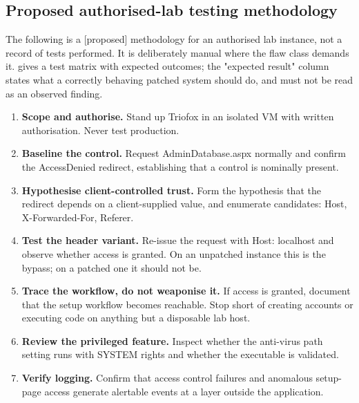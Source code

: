 \documentclass[11pt,a4paper]{article}
\newcommand{\code}[1]{{\small\ttfamily #1}}
\newcommand{\tier}[1]{{\small\color{meta}\textsf{[#1]}}}
\begin{document}
\subsection{Proposed authorised-lab testing methodology}

The following is a \tier{proposed} methodology for an authorised lab instance, not a record of tests performed. It is deliberately manual where the flaw class demands it.  gives a test matrix with expected outcomes; the "expected result" column states what a correctly behaving patched system should do, and must not be read as an observed finding.

\begin{enumerate}
\item \textbf{Scope and authorise.} Stand up Triofox in an isolated VM with written authorisation. Never test production.
\item \textbf{Baseline the control.} Request \code{AdminDatabase.aspx} normally and confirm the \code{AccessDenied} redirect, establishing that a control is nominally present.
\item \textbf{Hypothesise client-controlled trust.} Form the hypothesis that the redirect depends on a client-supplied value, and enumerate candidates: \code{Host}, \code{X-Forwarded-For}, \code{Referer}.
\item \textbf{Test the header variant.} Re-issue the request with \code{Host: localhost} and observe whether access is granted. On an unpatched instance this is the bypass; on a patched one it should not be.
\item \textbf{Trace the workflow, do not weaponise it.} If access is granted, document that the setup workflow becomes reachable. Stop short of creating accounts or executing code on anything but a disposable lab host.
\item \textbf{Review the privileged feature.} Inspect whether the anti-virus path setting runs with \code{SYSTEM} rights and whether the executable is validated.
\item \textbf{Verify logging.} Confirm that access control failures and anomalous setup-page access generate alertable events at a layer outside the application.
\end{enumerate}
\end{document}
